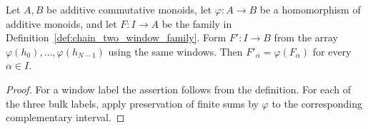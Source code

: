 \begin{lemma}
    \label{thm:chain_two_window_family_map}
    \leanok
    Let $A,B$ be additive commutative monoids, let $\varphi:A\to B$ be a
    homomorphism of additive monoids, and let $F:I\to A$ be the family in
    Definition~\ref{def:chain_two_window_family}. Form $F':I\to B$ from the
    array $\varphi(h_0),\ldots,\varphi(h_{N-1})$ using the same windows.
    Then $F'_\alpha=\varphi(F_\alpha)$ for every $\alpha\in I$.
\end{lemma}
\begin{proof}\leanok
    For a window label the assertion follows from the definition.
    For each of the three bulk labels, apply preservation of finite sums
    by $\varphi$ to the corresponding complementary interval.
\end{proof}


